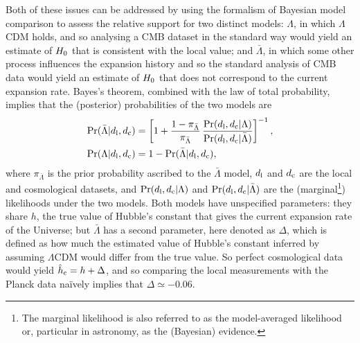 \documentclass[a4paper,fleqn,usenatbib]{mnras}
\newcommand{\pdiff}{\pi_{\bar{\Lambda}}}
\newcommand{\msame}{\Lambda}
\newcommand{\mdiff}{\bar{\Lambda}}
\newcommand{\hcobs}{\hat{h}_{\rm c}}
\newcommand{\datl}{d_{\rm l}}
\newcommand{\datc}{d_{\rm c}}
\begin{document}
{Both of these issues can be addressed by 
using the formalism of Bayesian model comparison to assess
the relative support for two distinct models:
$\msame$, in 
which $\Lambda$CDM holds, and so analysing a CMB
dataset in the standard way
would yield an estimate of $H_0$ that is consistent with the local value;
and 
$\mdiff$, in which some other process influences 
the expansion history
and so the standard
analysis of CMB data would yield an 
estimate of $H_0$ that does not correspond to the current
expansion rate.
Bayes's theorem, combined with the law of total probability,
implies that the (posterior) probabilities of the two models are
\begin{align}
\prob(\mdiff | \datl , \datc)
 & = \left[1 + \frac{1 - \pdiff}{\pdiff} \,
   \frac{\prob(\datl, \datc | \msame)}{\prob(\datl, \datc | \mdiff)}
    \right]^{-1}, \label{equation:pmd}\\
\prob(\msame | \datl , \datc) & = 1 - \prob(\mdiff | \datl , \datc),\label{equation:pms}
\end{align}
where $\pdiff$ is the prior probability ascribed to the $\mdiff$ model,
$\datl$ and $\datc$ are the local and cosmological datasets,
and 
$\prob(\datl, \datc | \msame)$ 
and
$\prob(\datl, \datc | \mdiff)$
are the (marginal\footnote{The
marginal likelihood is
also referred to as the model-averaged likelihood or,
particular in astronomy, as the (Bayesian) evidence.}) likelihoods
under the two models.
Both models have unspecified parameters:
they share $h$, the true value of Hubble's constant 
that gives the current expansion rate of the Universe;
but $\mdiff$ has a second parameter,
here denoted as $\Delta$, 
which is defined as how much the estimated value of 
Hubble's constant inferred by assuming $\Lambda$CDM 
would differ from the true value.
So perfect cosmological data would yield
$\hcobs = h + \Delta$, 
and so comparing the local measurements with the 
Planck data na\"ively implies that $\Delta \simeq -0.06$.

}
\end{document}
